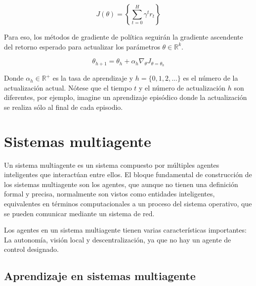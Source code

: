 \begin{equation}
J(\theta) = \left\lbrace \sum_{t=0}^H \gamma^t r_t \right\rbrace
\end{equation}

Para eso, los métodos de gradiente de política seguirán la gradiente ascendente del retorno esperado para actualizar los parámetros $\theta \in \mathbb{R}^k$.

\begin{equation}
\theta_{h+1} = \theta_h + \alpha_h \nabla_\theta J_{\theta = \theta_h}
\end{equation}

Donde $\alpha_h \in \mathbb{R}^+$ es la tasa de aprendizaje y $h = \{0,1,2,...\}$ es el número de la actualización actual. Nótese que el tiempo $t$ y el número de actualización $h$ son diferentes, por ejemplo, imagine un aprendizaje episódico donde la actualización se realiza sólo al final de cada episodio.


\section{Sistemas multiagente}

Un sistema multiagente es un sistema compuesto por múltiples agentes inteligentes que interactúan entre ellos. El bloque fundamental de construcción de los sistemas multiagente son los agentes, que aunque no tienen una definición formal y precisa, normalmente son vistos como entidades inteligentes, equivalentes en términos computacionales a un proceso del sistema operativo, que se pueden comunicar mediante un sistema de red.

Los agentes en un sistema multiagente tienen varias características importantes: La autonomía, visión local y descentralización, ya que no hay un agente de control designado.


\subsection{Aprendizaje en sistemas multiagente}


